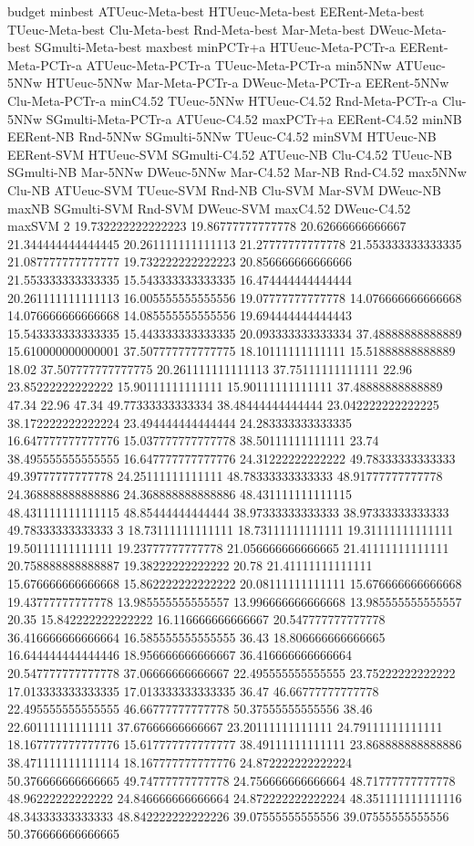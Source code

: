 budget minbest ATUeuc-Meta-best HTUeuc-Meta-best EERent-Meta-best TUeuc-Meta-best Clu-Meta-best Rnd-Meta-best Mar-Meta-best DWeuc-Meta-best SGmulti-Meta-best maxbest minPCTr+a HTUeuc-Meta-PCTr-a EERent-Meta-PCTr-a ATUeuc-Meta-PCTr-a TUeuc-Meta-PCTr-a min5NNw ATUeuc-5NNw HTUeuc-5NNw Mar-Meta-PCTr-a DWeuc-Meta-PCTr-a EERent-5NNw Clu-Meta-PCTr-a minC4.52 TUeuc-5NNw HTUeuc-C4.52 Rnd-Meta-PCTr-a Clu-5NNw SGmulti-Meta-PCTr-a ATUeuc-C4.52 maxPCTr+a EERent-C4.52 minNB EERent-NB Rnd-5NNw SGmulti-5NNw TUeuc-C4.52 minSVM HTUeuc-NB EERent-SVM HTUeuc-SVM SGmulti-C4.52 ATUeuc-NB Clu-C4.52 TUeuc-NB SGmulti-NB Mar-5NNw DWeuc-5NNw Mar-C4.52 Mar-NB Rnd-C4.52 max5NNw Clu-NB ATUeuc-SVM TUeuc-SVM Rnd-NB Clu-SVM Mar-SVM DWeuc-NB maxNB SGmulti-SVM Rnd-SVM DWeuc-SVM maxC4.52 DWeuc-C4.52 maxSVM
2 19.732222222222223 19.86777777777778 20.62666666666667 21.344444444444445 20.261111111111113 21.27777777777778 21.553333333333335 21.087777777777777 19.732222222222223 20.856666666666666 21.553333333333335 15.543333333333335 16.474444444444444 20.261111111111113 16.005555555555556 19.07777777777778 14.076666666666668 14.076666666666668 14.085555555555556 19.694444444444443 15.543333333333335 15.443333333333335 20.093333333333334 37.48888888888889 15.610000000000001 37.507777777777775 18.10111111111111 15.51888888888889 18.02 37.507777777777775 20.261111111111113 37.75111111111111 22.96 23.85222222222222 15.90111111111111 15.90111111111111 37.48888888888889 47.34 22.96 47.34 49.77333333333334 38.48444444444444 23.042222222222225 38.172222222222224 23.494444444444444 24.283333333333335 16.647777777777776 15.037777777777778 38.50111111111111 23.74 38.495555555555555 16.647777777777776 24.31222222222222 49.78333333333333 49.39777777777778 24.25111111111111 48.78333333333333 48.91777777777778 24.368888888888886 24.368888888888886 48.431111111111115 48.431111111111115 48.85444444444444 38.97333333333333 38.97333333333333 49.78333333333333
3 18.73111111111111 18.73111111111111 19.31111111111111 19.50111111111111 19.23777777777778 21.056666666666665 21.41111111111111 20.758888888888887 19.38222222222222 20.78 21.41111111111111 15.676666666666668 15.862222222222222 20.08111111111111 15.676666666666668 19.43777777777778 13.985555555555557 13.996666666666668 13.985555555555557 20.35 15.842222222222222 16.116666666666667 20.547777777777778 36.416666666666664 16.585555555555555 36.43 18.806666666666665 16.644444444444446 18.956666666666667 36.416666666666664 20.547777777777778 37.06666666666667 22.495555555555555 23.75222222222222 17.013333333333335 17.013333333333335 36.47 46.66777777777778 22.495555555555555 46.66777777777778 50.37555555555556 38.46 22.60111111111111 37.67666666666667 23.20111111111111 24.79111111111111 18.167777777777776 15.617777777777777 38.49111111111111 23.868888888888886 38.471111111111114 18.167777777777776 24.872222222222224 50.376666666666665 49.74777777777778 24.756666666666664 48.71777777777778 48.96222222222222 24.846666666666664 24.872222222222224 48.351111111111116 48.34333333333333 48.842222222222226 39.07555555555556 39.07555555555556 50.376666666666665
